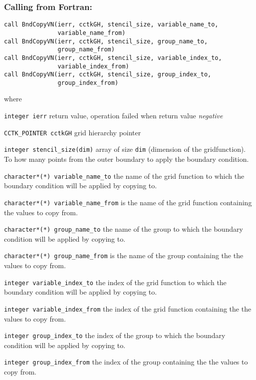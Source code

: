 \documentclass{article}
\newcommand{\entrylabel}[1]{\mbox{\textsf{#1}}\hfil}
\newenvironment{entry}
  {\begin{list}{}
    {\renewcommand{\makelabel}{\entrylabel}
      \setlength{\labelwidth}{90pt}
      \setlength{\leftmargin}{\labelwidth+\labelsep}
    }
  }
  {\end{list}}
\newlength{\Mylen}
\newcommand{\Lentrylabel}[1]{%
  \settowidth{\Mylen}{\textsf{#1}}%
  \ifthenelse{\lengthtest{\Mylen > \labelwidth}}%
    {\parbox[b]{\labelwidth} %
      {\makebox[0pt][l]{\textsf{#1}}\\}} %
    {\textsf{#1}} %

  \hfil\relax}
\newenvironment{Lentry}
  {\renewcommand{\entrylabel}{\Lentrylabel}
   \begin{entry}}
  {\end{entry}}
\begin{document}
\subsubsection*{Calling from Fortran:}
\begin{verbatim}
call BndCopyVN(ierr, cctkGH, stencil_size, variable_name_to,  
               variable_name_from)
call BndCopyVN(ierr, cctkGH, stencil_size, group_name_to,     
               group_name_from)
call BndCopyVN(ierr, cctkGH, stencil_size, variable_index_to, 
               variable_index_from)
call BndCopyVN(ierr, cctkGH, stencil_size, group_index_to,    
               group_index_from)
\end{verbatim}
where
\begin{Lentry}
\item[{\tt integer ierr}] return value, operation failed when return
value {\em negative}
\item[{\tt CCTK\_POINTER cctkGH}] grid hierarchy pointer
\item[{\tt integer stencil\_size(dim)}] array of size {\tt dim}
(dimension of the gridfunction). To how many points from the outer
boundary to apply the boundary condition. 

\item[{\tt character*(*) variable\_name\_to}] the name of the grid function 
	to which the boundary condition will be applied by copying to.
\item[{\tt character*(*) variable\_name\_from}]  is the name of the grid function 
    containing the values to copy from.

\item[{\tt character*(*) group\_name\_to}] the name of the group
	to which the boundary condition will be applied by copying to.
\item[{\tt character*(*) group\_name\_from}] is the name of the group
    containing the the values to copy from.

\item[{\tt integer variable\_index\_to}] the index of the grid function 
	to which the boundary condition will be applied by copying to.
\item[{\tt integer variable\_index\_from}] the index of the grid function 
    containing the the values to copy from.

\item[{\tt integer group\_index\_to}] the index of the group
	to which the boundary condition will be applied by copying to.
\item[{\tt integer group\_index\_from}] the index of the group
    containing the the values to copy from.
\end{Lentry}
\end{document}

